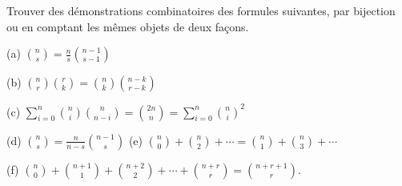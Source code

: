 Trouver des démonstrations combinatoires des formules suivantes, par bijection ou en comptant les mêmes objets de deux façons.

(a) $\binom{n}{s} = \frac{n}{s}\binom{n - 1}{s - 1}$

(b) $\binom{n}{r}\binom{r}{k} = \binom{n}{k}\binom{n - k}{r - k}$

(c) $\sum_{i=0}^n \binom{n}{i}\binom{n}{n - i} = \binom{2n}{n} = \sum_{i=0}^n \binom{n}{i}^2$

(d) $\binom{n}{s} = \frac{n}{n - s}\binom{n - 1}{s}$ \quad (e) $\binom{n}{0} + \binom{n}{2} + \cdots = \binom{n}{1} + \binom{n}{3} + \cdots$

(f) $\binom{n}{0} + \binom{n + 1}{1} + \binom{n + 2}{2} + \cdots + \binom{n + r}{r} = \binom{n + r + 1}{r}$.
